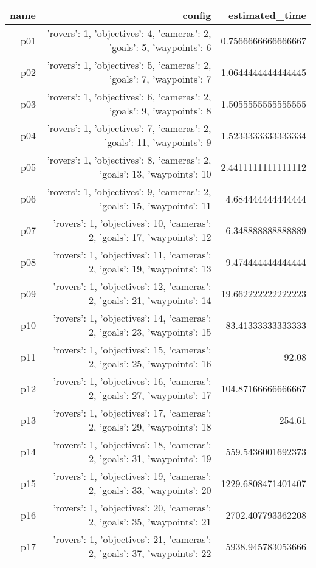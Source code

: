 \documentclass{article}
\begin{document}
                            \begin{center}
                            \scriptsize
                            \begin{tabular}{r|r|r}
                            name & config & estimated\_time\\\midrule
                              p01&{'rovers': 1, 'objectives': 4, 'cameras': 2, 'goals': 5, 'waypoints': 6}&0.7566666666666667\\
  p02&{'rovers': 1, 'objectives': 5, 'cameras': 2, 'goals': 7, 'waypoints': 7}&1.0644444444444445\\
  p03&{'rovers': 1, 'objectives': 6, 'cameras': 2, 'goals': 9, 'waypoints': 8}&1.5055555555555555\\
  p04&{'rovers': 1, 'objectives': 7, 'cameras': 2, 'goals': 11, 'waypoints': 9}&1.5233333333333334\\
  p05&{'rovers': 1, 'objectives': 8, 'cameras': 2, 'goals': 13, 'waypoints': 10}&2.4411111111111112\\
  p06&{'rovers': 1, 'objectives': 9, 'cameras': 2, 'goals': 15, 'waypoints': 11}&4.684444444444444\\
  p07&{'rovers': 1, 'objectives': 10, 'cameras': 2, 'goals': 17, 'waypoints': 12}&6.348888888888889\\
  p08&{'rovers': 1, 'objectives': 11, 'cameras': 2, 'goals': 19, 'waypoints': 13}&9.474444444444444\\
  p09&{'rovers': 1, 'objectives': 12, 'cameras': 2, 'goals': 21, 'waypoints': 14}&19.662222222222223\\
  p10&{'rovers': 1, 'objectives': 14, 'cameras': 2, 'goals': 23, 'waypoints': 15}&83.41333333333333\\
  p11&{'rovers': 1, 'objectives': 15, 'cameras': 2, 'goals': 25, 'waypoints': 16}&92.08\\
  p12&{'rovers': 1, 'objectives': 16, 'cameras': 2, 'goals': 27, 'waypoints': 17}&104.87166666666667\\
  p13&{'rovers': 1, 'objectives': 17, 'cameras': 2, 'goals': 29, 'waypoints': 18}&254.61\\
  p14&{'rovers': 1, 'objectives': 18, 'cameras': 2, 'goals': 31, 'waypoints': 19}&559.5436001692373\\
  p15&{'rovers': 1, 'objectives': 19, 'cameras': 2, 'goals': 33, 'waypoints': 20}&1229.6808471401407\\
  p16&{'rovers': 1, 'objectives': 20, 'cameras': 2, 'goals': 35, 'waypoints': 21}&2702.407793362208\\
  p17&{'rovers': 1, 'objectives': 21, 'cameras': 2, 'goals': 37, 'waypoints': 22}&5938.945783053666\\

\end{tabular}
\end{center}
\end{document}
